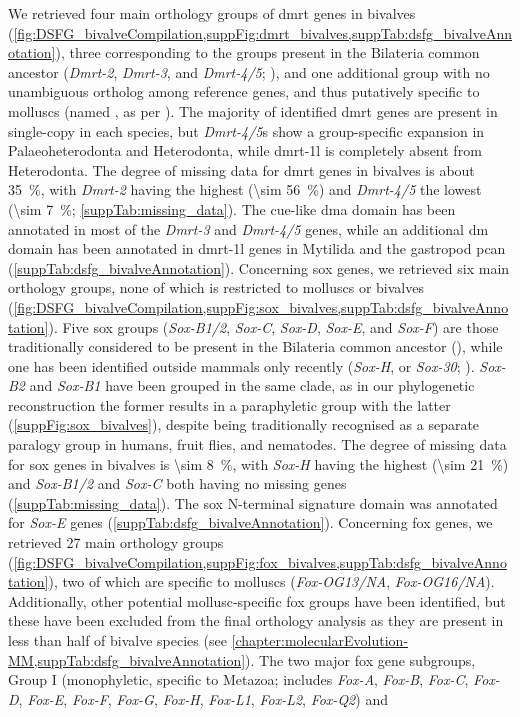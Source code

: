 We retrieved four main orthology groups of \gls{dmrt} genes in bivalves (\cref{fig:DSFG_bivalveCompilation,suppFig:dmrt_bivalves,suppTab:dsfg_bivalveAnnotation}), three corresponding to the groups present in the Bilateria common ancestor (\textit{Dmrt-2}, \textit{Dmrt-3}, and \textit{Dmrt-4/5}; ), and one additional group with no unambiguous ortholog among reference genes, and thus putatively specific to molluscs (named , as per ). The majority of identified \gls{dmrt} genes are present in single-copy in each species, but \textit{Dmrt-4/5}s show a group-specific expansion in Palaeoheterodonta and Heterodonta, while \gls{dmrt-1l} is completely absent from Heterodonta. The degree of missing data for \gls{dmrt} genes in bivalves is about \qty{35}{\percent}, with \textit{Dmrt-2} having the highest (\qty{\sim 56}{\percent}) and \textit{Dmrt-4/5} the lowest (\qty{\sim 7}{\percent}; \cref{suppTab:missing_data}). The \gls{cue}-like \gls{dma} domain has been annotated in most of the \textit{Dmrt-3} and \textit{Dmrt-4/5} genes, while an additional \gls{dm} domain has been annotated in \gls{dmrt-1l} genes in Mytilida and the gastropod \gls{pcan} (\cref{suppTab:dsfg_bivalveAnnotation}). Concerning \gls{sox} genes, we retrieved six main orthology groups, none of which is restricted to molluscs or bivalves (\cref{fig:DSFG_bivalveCompilation,suppFig:sox_bivalves,suppTab:dsfg_bivalveAnnotation}). Five \gls{sox} groups (\textit{Sox-B1/2}, \textit{Sox-C}, \textit{Sox-D}, \textit{Sox-E}, and \textit{Sox-F}) are those traditionally considered to be present in the Bilateria common ancestor (), while one has been identified outside mammals only recently (\textit{Sox-H}, or \textit{Sox-30}; ). \textit{Sox-B2} and \textit{Sox-B1} have been grouped in the same clade, as in our phylogenetic reconstruction the former results in a paraphyletic group with the latter (\cref{suppFig:sox_bivalves}), despite being traditionally recognised as a separate paralogy group in humans, fruit flies, and nematodes. The degree of missing data for \gls{sox} genes in bivalves is \qty{\sim 8}{\percent}, with \textit{Sox-H} having the highest (\qty{\sim 21}{\percent}) and \textit{Sox-B1/2} and \textit{Sox-C} both having no missing genes (\cref{suppTab:missing_data}). The \gls{sox} N-terminal signature domain was annotated for \textit{Sox-E} genes (\cref{suppTab:dsfg_bivalveAnnotation}). Concerning \gls{fox} genes, we retrieved 27 main orthology groups (\cref{fig:DSFG_bivalveCompilation,suppFig:fox_bivalves,suppTab:dsfg_bivalveAnnotation}), two of which are specific to molluscs (\textit{Fox-OG13/NA}, \textit{Fox-OG16/NA}). Additionally, other potential mollusc-specific \gls{fox} groups have been identified, but these have been excluded from the final orthology analysis as they are present in less than half of bivalve species (see \cref{chapter:molecularEvolution-MM,suppTab:dsfg_bivalveAnnotation}). The two major \gls{fox} gene subgroups, Group I (monophyletic, specific to Metazoa; includes \textit{Fox-A}, \textit{Fox-B}, \textit{Fox-C}, \textit{Fox-D}, \textit{Fox-E}, \textit{Fox-F}, \textit{Fox-G}, \textit{Fox-H}, \textit{Fox-L1}, \textit{Fox-L2}, \textit{Fox-Q2}) and 